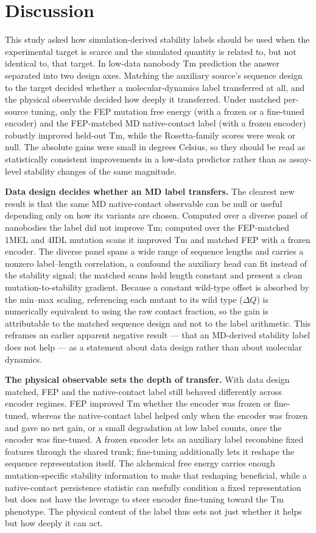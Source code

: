 
\section*{Discussion}

This study asked how simulation-derived stability labels should be used when the
experimental target is scarce and the simulated quantity is related to, but not
identical to, that target. In low-data nanobody Tm prediction the answer separated
into two design axes. Matching the auxiliary source's sequence design to the target
decided whether a molecular-dynamics label transferred at all, and the physical
observable decided how deeply it transferred. Under matched per-source tuning, only
the FEP mutation free energy (with a frozen or a fine-tuned encoder) and the
FEP-matched MD native-contact label (with a frozen encoder) robustly improved
held-out Tm, while the Rosetta-family scores were weak or null. The absolute gains
were small in degrees Celsius, so they should be read as statistically consistent
improvements in a low-data predictor rather than as assay-level stability changes of
the same magnitude.

\textbf{Data design decides whether an MD label transfers.} The clearest new result
is that the same MD native-contact observable can be null or useful depending only
on how its variants are chosen. Computed over a diverse panel of nanobodies the
label did not improve Tm; computed over the FEP-matched 1MEL and 4IDL mutation
scans it improved Tm and matched FEP with a frozen encoder. The diverse panel
spans a wide range of sequence lengths and carries a nonzero label--length
correlation, a confound the auxiliary head can fit instead of the stability signal;
the matched scans hold length constant and present a clean mutation-to-stability
gradient. Because a constant wild-type offset is absorbed by the min--max scaling,
referencing each mutant to its wild type ($\Delta Q$) is numerically equivalent to
using the raw contact fraction, so the gain is attributable to the matched sequence
design and not to the label arithmetic. This reframes an earlier apparent negative
result --- that an MD-derived stability label does not help --- as a statement about
data design rather than about molecular dynamics.

\textbf{The physical observable sets the depth of transfer.} With data design
matched, FEP and the native-contact label still behaved differently across encoder
regimes. FEP improved Tm whether the encoder was frozen or fine-tuned, whereas the
native-contact label helped only when the encoder was frozen and gave no net gain,
or a small degradation at low label counts, once the encoder was fine-tuned. A
frozen encoder lets an auxiliary label recombine fixed features through the shared
trunk; fine-tuning additionally lets it reshape the sequence representation itself.
The alchemical free energy carries enough mutation-specific stability information to
make that reshaping beneficial, while a native-contact persistence statistic can
usefully condition a fixed representation but does not have the leverage to steer
encoder fine-tuning toward the Tm phenotype. The physical content of the label thus
sets not just whether it helps but how deeply it can act.

